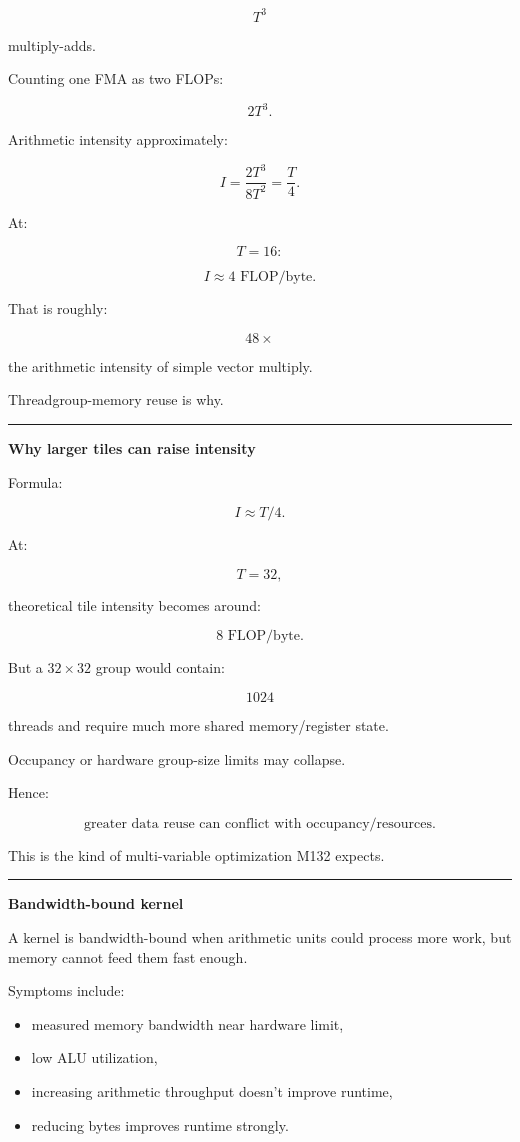 \[
T^3
\]

multiply-adds.

Counting one FMA as two FLOPs:

\[
2T^3.
\]

Arithmetic intensity approximately:

\[
\boxed{
I=
\frac{
2T^3
}{
8T^2
}
=
\frac T4.
}
\]

At:

\[
T=16:
\]

\[
\boxed{
I\approx4\text{ FLOP/byte}.
}
\]

That is roughly:

\[
48\times
\]

the arithmetic intensity of simple vector multiply.

Threadgroup-memory reuse is why.

\begin{center}\rule{0.5\linewidth}{0.5pt}\end{center}

\textbf{Why larger tiles can raise intensity}

Formula:

\[
I\approx T/4.
\]

At:

\[
T=32,
\]

theoretical tile intensity becomes around:

\[
8\text{ FLOP/byte}.
\]

But a \(32\times32\) group would contain:

\[
1024
\]

threads and require much more shared memory/register state.

Occupancy or hardware group-size limits may collapse.

Hence:

\[
\boxed{
\text{greater data reuse can conflict with occupancy/resources}.
}
\]

This is the kind of multi-variable optimization M132 expects.

\begin{center}\rule{0.5\linewidth}{0.5pt}\end{center}

\textbf{Bandwidth-bound kernel}

A kernel is bandwidth-bound when arithmetic units could process more work, but memory cannot feed them fast enough.

Symptoms include:

\begin{itemize}
\tightlist
\item
  measured memory bandwidth near hardware limit,
\item
  low ALU utilization,
\item
  increasing arithmetic throughput doesn't improve runtime,
\item
  reducing bytes improves runtime strongly.
\end{itemize}

